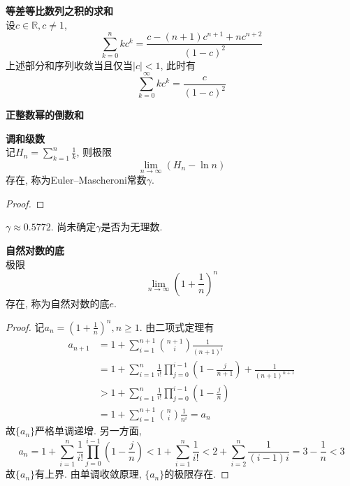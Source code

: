 \begin{col}\textbf{等差等比数列之积的求和}\\
设$c\in \mathbb{R}, c\neq 1$, 
\begin{equation}
    \sum_{k=0}^n kc^k=\frac{c-(n+1)c^{n+1}+nc^{n+2}}{(1-c)^2}
\end{equation}
上述部分和序列收敛当且仅当$|c|<1$, 此时有 
\begin{equation}
\sum_{k=0}^\infty kc^k=\frac{c}{(1-c)^2}
\end{equation}
\end{col}

\begin{pro}\textbf{正整数幂的倒数和}\\
\end{pro}

\begin{pro}\textbf{调和级数}\\
记$H_n = \sum_{k=1}^n \frac{1}{k}$, 则极限
\begin{equation}
    \lim\limits_{n\to \infty} (H_n-\ln n)
\end{equation}
存在, 称为Euler–Mascheroni常数$\gamma$. 
\end{pro}
\begin{proof}

\end{proof}
$\gamma \approx 0.5772$. 尚未确定$\gamma$是否为无理数. 

\begin{dfn}\textbf{自然对数的底}\\
极限
\begin{equation}
    \lim\limits_{n\to \infty} \left(1+\frac{1}{n}\right)^n
\end{equation}
存在, 称为自然对数的底$e$. 
\end{dfn}
\begin{proof}
记$a_n = \left(1+\frac{1}{n}\right)^n, n\ge 1$. 由二项式定理有
\begin{align*}
a_{n+1} &= 1+\sum_{i=1}^{n+1} \binom{n+1}{i} \frac{1}{(n+1)^{i}}\\
&= 1+ \sum_{i=1}^{n} \frac{1}{i!}\prod_{j=0}^{i-1} \left(1-\frac{j}{n+1}\right)+\frac{1}{(n+1)^{n+1}}\\
&>1+ \sum_{i=1}^{n} \frac{1}{i!}\prod_{j=0}^{i-1} \left(1-\frac{j}{n}\right)\\
&=1+\sum_{i=1}^{n+1} \binom{n}{i} \frac{1}{n^{i}} = a_n
\end{align*}
故$\{a_n\}$严格单调递增. 另一方面, 
\begin{equation}
    a_n = 1+ \sum_{i=1}^{n} \frac{1}{i!}\prod_{j=0}^{i-1} \left(1-\frac{j}{n}\right) < 1+\sum_{i=1}^{n} \frac{1}{i!} < 2+\sum_{i=2}^{n} \frac{1}{(i-1)i} = 3-\frac{1}{n}<3
\label{eq:inv_prog}
\end{equation}
故$\{a_n\}$有上界. 由单调收敛原理, $\{a_n\}$的极限存在. 
\end{proof}

